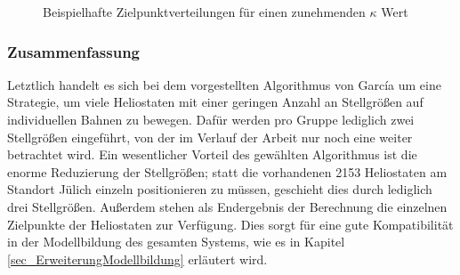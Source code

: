 \begin{figure}[h!]
    \centering
    \setlength{\fboxsep}{1pt}
    \setlength{\fboxrule}{1pt}
    \caption[Beispielhafte Zielpunktverteilungen für einen zunehmenden $\kappa$ Wert]{Beispielhafte Zielpunktverteilungen für einen zunehmenden $\kappa$ Wert \cite[S.11]{Garcia2}}
    \label{fig_GarciaZielpunkte}
\end{figure}

\subsubsection*{Zusammenfassung} \label{subsubsec_Zusammenfassung}
Letztlich handelt es sich bei dem vorgestellten Algorithmus von García um eine Strategie, um viele Heliostaten mit einer geringen Anzahl an Stellgrößen auf individuellen Bahnen zu bewegen.
Dafür werden pro Gruppe lediglich zwei Stellgrößen eingeführt, von der im Verlauf der Arbeit nur noch eine weiter betrachtet wird.
Ein wesentlicher Vorteil des gewählten Algorithmus ist die enorme Reduzierung der Stellgrößen; statt die vorhandenen 2153 Heliostaten am Standort Jülich einzeln positionieren zu müssen, geschieht dies durch lediglich drei Stellgrößen.
Außerdem stehen als Endergebnis der Berechnung die einzelnen Zielpunkte der Heliostaten zur Verfügung.
Dies sorgt für eine gute Kompatibilität in der Modellbildung des gesamten Systems, wie es in Kapitel \ref{sec_ErweiterungModellbildung} erläutert wird.


